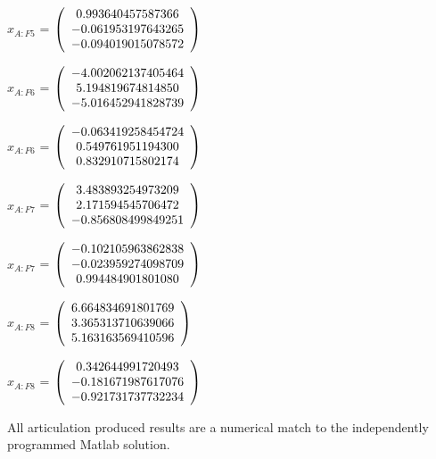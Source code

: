 \begin{description}
$\hat{x}_{A:F5}$  = $\left( \begin{array} {ccc} 0.993640457587366 \\ -0.061953197643265 \\ -0.094019015078572
\end{array} \right)\\ \\$

$x_{A:F6}$  = $\left( \begin{array} {ccc} -4.002062137405464 \\ 5.194819674814850 \\ -5.016452941828739
\end{array} \right)\\ \\$

$\hat{x}_{A:F6}$  = $\left( \begin{array} {ccc} -0.063419258454724 \\ 0.549761951194300 \\ 0.832910715802174
\end{array} \right)\\ \\$

$x_{A:F7}$  = $\left( \begin{array} {ccc} 3.483893254973209 \\ 2.171594545706472 \\ -0.856808499849251
\end{array} \right)\\ \\$

$\hat{x}_{A:F7}$  = $\left( \begin{array} {ccc} -0.102105963862838 \\ -0.023959274098709 \\ 0.994484901801080
\end{array} \right)\\ \\$

$x_{A:F8}$  = $\left( \begin{array} {ccc} 6.664834691801769 \\ 3.365313710639066 \\ 5.163163569410596
\end{array} \right)\\ \\$

$\hat{x}_{A:F8}$  = $\left( \begin{array} {ccc} 0.342644991720493 \\ -0.181671987617076 \\ -0.921731737732234
\end{array} \right)\\ \\$

All \ModelDesc articulation produced results are a numerical match to the
independently programmed Matlab solution.


\end{description}

